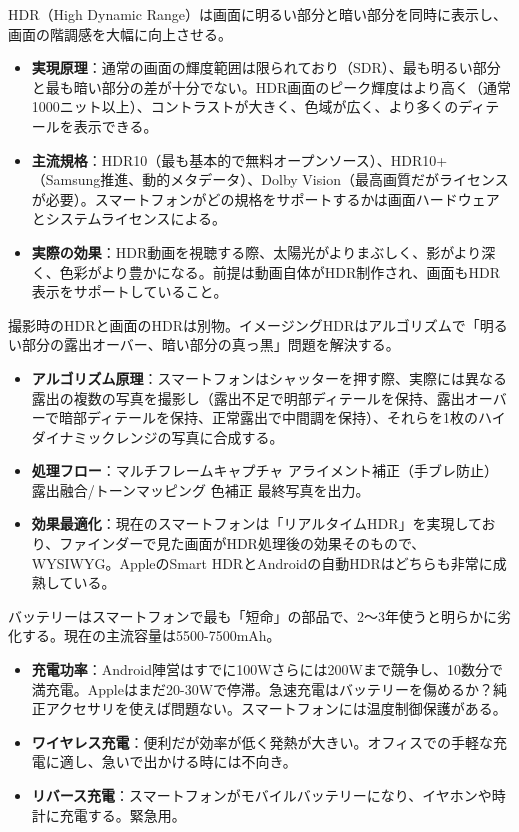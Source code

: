 
HDR（High Dynamic Range）は画面に明るい部分と暗い部分を同時に表示し、画面の階調感を大幅に向上させる。

\begin{itemize}
  \item \textbf{実現原理}：通常の画面の輝度範囲は限られており（SDR）、最も明るい部分と最も暗い部分の差が十分でない。HDR画面のピーク輝度はより高く（通常1000ニット以上）、コントラストが大きく、色域が広く、より多くのディテールを表示できる。
  \item \textbf{主流規格}：HDR10（最も基本的で無料オープンソース）、HDR10+（Samsung推進、動的メタデータ）、Dolby Vision（最高画質だがライセンスが必要）。スマートフォンがどの規格をサポートするかは画面ハードウェアとシステムライセンスによる。
  \item \textbf{実際の効果}：HDR動画を視聴する際、太陽光がよりまぶしく、影がより深く、色彩がより豊かになる。前提は動画自体がHDR制作され、画面もHDR表示をサポートしていること。
\end{itemize}


撮影時のHDRと画面のHDRは別物。イメージングHDRはアルゴリズムで「明るい部分の露出オーバー、暗い部分の真っ黒」問題を解決する。

\begin{itemize}
  \item \textbf{アルゴリズム原理}：スマートフォンはシャッターを押す際、実際には異なる露出の複数の写真を撮影し（露出不足で明部ディテールを保持、露出オーバーで暗部ディテールを保持、正常露出で中間調を保持）、それらを1枚のハイダイナミックレンジの写真に合成する。
  \item \textbf{処理フロー}：マルチフレームキャプチャ アライメント補正（手ブレ防止） 露出融合/トーンマッピング 色補正 最終写真を出力。
  \item \textbf{効果最適化}：現在のスマートフォンは「リアルタイムHDR」を実現しており、ファインダーで見た画面がHDR処理後の効果そのもので、WYSIWYG。AppleのSmart HDRとAndroidの自動HDRはどちらも非常に成熟している。
\end{itemize}


バッテリーはスマートフォンで最も「短命」の部品で、2〜3年使うと明らかに劣化する。現在の主流容量は5500-7500mAh。

\begin{itemize}
  \item \textbf{充電功率}：Android陣営はすでに100Wさらには200Wまで競争し、10数分で満充電。Appleはまだ20-30Wで停滞。急速充電はバッテリーを傷めるか？純正アクセサリを使えば問題ない。スマートフォンには温度制御保護がある。
  \item \textbf{ワイヤレス充電}：便利だが効率が低く発熱が大きい。オフィスでの手軽な充電に適し、急いで出かける時には不向き。
  \item \textbf{リバース充電}：スマートフォンがモバイルバッテリーになり、イヤホンや時計に充電する。緊急用。
\end{itemize}

